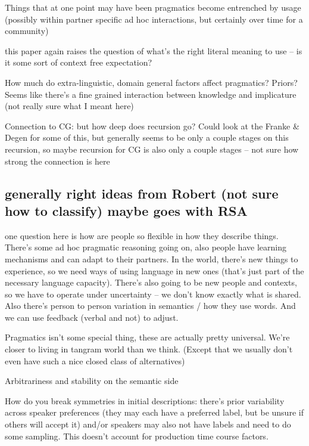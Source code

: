 \documentclass[]{article}
\begin{document}
Things that at one point may have been pragmatics become entrenched by usage (possibly within partner specific ad hoc interactions, but certainly over time for a community) 

\cite{goodman2013} this paper again raises the question of what's the right literal meaning to use  -- is it some sort of context free expectation? 

How much do extra-linguistic, domain general factors affect pragmatics? Priors? Seems like there's a fine grained interaction between knowledge and implicature (not really sure what I meant here)

Connection to CG: but how deep does recursion go? Could look at the Franke \& Degen for some of this, but generally seems to be only a couple stages on this recursion, so maybe recursion for CG is also only a couple stages -- not sure how strong the connection is here

\subsection{generally right ideas from Robert (not sure how to classify) maybe goes with RSA}

\cite{hawkins2020b} one question here is how are people so flexible in how they describe things. There's some ad hoc pragmatic reasoning going on, also people have learning mechanisms and can adapt to their partners. In the world, there's new things to experience, so we need ways of using language in new ones (that's just part of the necessary language capacity). There's also going to be new people and contexts, so we have to operate under uncertainty -- we don't know exactly what is shared. Also there's person to person variation in semantics / how they use words. And we can use feedback (verbal and not) to adjust. 

Pragmatics isn't some special thing, these are actually pretty universal. We're closer to living in tangram world than we think. (Except that we usually don't even have such a nice closed class of alternatives) 

Arbitrariness and stability on the semantic side 

\cite{hawkins2020b} How do you break symmetries in initial descriptions: there's prior variability across speaker preferences (they may each have a preferred label, but be unsure if others will accept it) and/or speakers may also not have labels and need to do some sampling. This doesn't account for production time course factors. 
\end{document}
